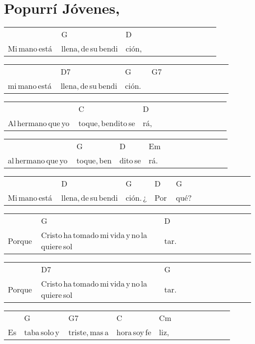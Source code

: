 \section*{Popurrí Jóvenes, \hfill}
\begin{multicols}{2}
\noindent
\begin{minipage}{\columnwidth}
\noindent
\noindent
\begin{tabular}{llllllllllll}
&G&D\\
Mi\,mano\,está\,&llena,\,de\,su\,bendi&ción,
\end{tabular}

\noindent
\begin{tabular}{llllllllllll}
&D7&G&G7\\
mi\,mano\,está\,&llena,\,de\,su\,bendi&ción.\,\,&
\end{tabular}

\noindent
\begin{tabular}{llllllllllll}
&C&D\\
Al\,hermano\,que\,yo\,&toque,\,bendito\,se&rá,
\end{tabular}

\noindent
\begin{tabular}{llllllllllll}
&G&D&Em\\
al\,hermano\,que\,yo\,&toque,\,ben&dito\,se&rá.
\end{tabular}

\noindent
\begin{tabular}{llllllllllll}
&D&G&D&G\\
Mi\,mano\,está\,&llena,\,de\,su\,bendi&ción.\,¿&Por\,&qué?
\end{tabular}

\noindent
\begin{tabular}{llllllllllll}
&G&D\\
Porque\,&Cristo\,ha\,tomado\,mi\,vida\,y\,no\,la\,quiere\,sol&tar.
\end{tabular}

\noindent
\begin{tabular}{llllllllllll}
&D7&G\\
Porque\,&Cristo\,ha\,tomado\,mi\,vida\,y\,no\,la\,quiere\,sol&tar.
\end{tabular}

\noindent
\begin{tabular}{llllllllllll}
&G&G7&C&Cm\\
Es&taba\,solo\,y\,&triste,\,mas\,a&hora\,soy\,fe&liz,
\end{tabular}


\end{minipage}
\end{multicols}

